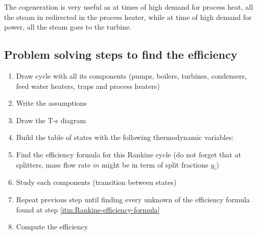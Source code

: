 \documentclass[10pt, twocolumn]{article}
\begin{document}
The cogeneration is very useful as at times of high demand for process heat, all the steam in redirected in the process heater, while at time of high demand for power, all the steam goes to the turbine.


\subsection{Problem solving steps to find the efficiency}
\begin{enumerate}
  \item Draw cycle with all its components (pumps, boilers, turbines, condensers, feed water heaters, traps and process heaters)
  \item Write the assumptions
  \item Draw the T-s diagram
  \item Build the table of states with the following thermodynamic variables:
  \item \label{itm:Rankine-efficiency-formula} Find the efficiency formula for this Rankine cycle (do not forget that at splitters, mass flow rate \(\dot{m}\) might be in term of split fractions \(y_i\))
  \item Study each components (transition between states)
  \item Repeat previous step until finding every unknown of the efficiency formula found at step \ref{itm:Rankine-efficiency-formula}
  \item Compute the efficiency
\end{enumerate}
\end{document}
